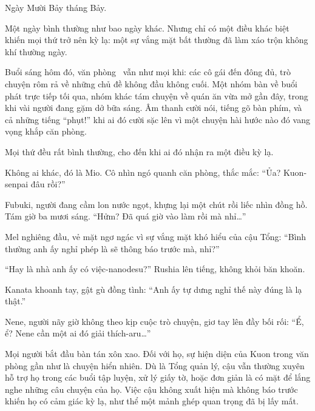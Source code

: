 \documentclass[../main.tex]{subfiles}
\begin{document}
\color{black}


Ngày Mười Bảy tháng Bảy.

Một ngày bình thường như bao ngày khác. Nhưng chỉ có một điều khác biệt khiến mọi thứ trở nên kỳ lạ: một sự vắng mặt bất thường đã làm xáo trộn không khí thường ngày.

Buổi sáng hôm đó, văn phòng \hll\ vẫn như mọi khi: các cô gái đến đông đủ, trò chuyện rôm rả về những chủ đề không đầu không cuối. Một nhóm bàn về buổi phát trực tiếp tối qua, nhóm khác tám chuyện về quán ăn vừa mở gần đây, trong khi vài người đang gặm dở bữa sáng. Âm thanh cười nói, tiếng gõ bàn phím, và cả những tiếng ``phụt!'' khi ai đó cười sặc lên vì một chuyện hài hước nào đó vang vọng khắp căn phòng.

Mọi thứ đều rất bình thường, cho đến khi ai đó nhận ra một điều kỳ lạ.

Không ai khác, đó là Mio. Cô nhìn ngó quanh căn phòng, thắc mắc: ``Ủa? Kuon-senpai đâu rồi?''

Fubuki, người đang cầm lon nước ngọt, khựng lại một chút rồi liếc nhìn đồng hồ. Tám giờ ba mươi sáng. ``Hửm? Đã quá giờ vào làm rồi mà nhỉ\dots''

Mel nghiêng đầu, vẻ mặt ngơ ngác vì sự vắng mặt khó hiểu của cậu Tổng: ``Bình thường anh ấy nghỉ phép là sẽ thông báo trước mà, nhỉ?''

``Hay là nhà anh ấy có việc-nanodesu?'' Rushia lên tiếng, không khỏi băn khoăn.

Kanata khoanh tay, gật gù đồng tình: ``Anh ấy tự dưng nghỉ thế này đúng là lạ thật.''

Nene, người nãy giờ không theo kịp cuộc trò chuyện, giơ tay lên đầy bối rối: ``Ể, ể? Nene cần một ai đó giải thích-aru\dots''

Mọi người bắt đầu bàn tán xôn xao. Đối với họ, sự hiện diện của Kuon trong văn phòng gần như là chuyện hiển nhiên. Dù là Tổng quản lý, cậu vẫn thường xuyên hỗ trợ họ trong các buổi tập luyện, xử lý giấy tờ, hoặc đơn giản là có mặt để lắng nghe những câu chuyện của họ. Việc cậu không xuất hiện mà không báo trước khiến họ có cảm giác kỳ lạ, như thể một mảnh ghép quan trọng đã bị lấy mất.
\end{document}
